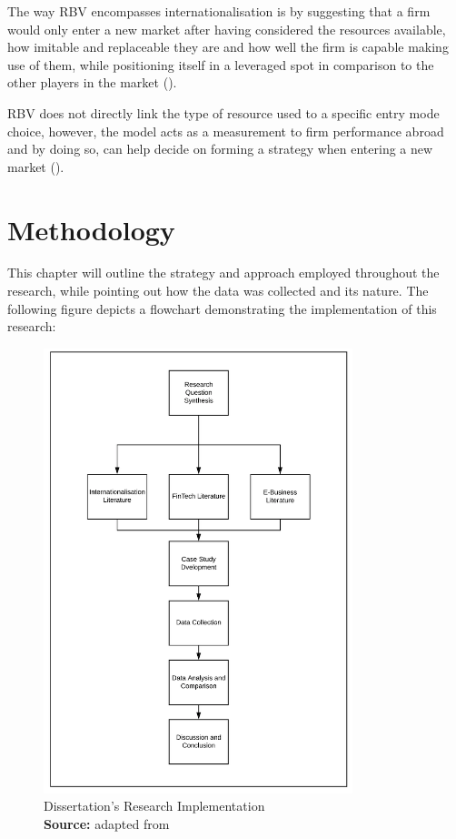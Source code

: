 \documentclass[11pt,a4paper]{article}
\newcommand*{\captionsource}[2]{%
  \caption[{#1}]{%
    #1%
    \\\hspace{\linewidth}%
    \textbf{Source:} #2%
  }%
}
\begin{document}
{{The way RBV encompasses internationalisation is by suggesting that a firm would only enter a new market after having considered the resources available, how imitable and replaceable they are and how well the firm is capable making use of them, while positioning itself in a leveraged spot in comparison to the other players in the market (\cite{ruzzierResourcebasedApproachInternationalisation2006}).  \par
RBV does not directly link the type of resource used to a specific entry mode choice, however, the model acts as a measurement to firm performance abroad and by doing so, can help decide on forming a strategy when entering a new market (\cite{tulungResourceAvailabilityFirm2017}). 
\newpage

\section{Methodology}
This chapter will outline the strategy and approach employed throughout the research, while pointing out how the data was collected and its nature. The following figure depicts a flowchart demonstrating the implementation of this research:

\begin{figure}[H]
	\centering
  \includegraphics[width=90mm]{figures/fig_research_plan}
  \vspace{5mm}
    \captionsetup{justification=centering,margin=2cm}
      \captionsource{Dissertation's Research Implementation}{adapted from \cite{sinkovicsEmployingInformationCommunication2006}}
	\label{fig:research_plan}
\end{figure}


}}
\end{document}
